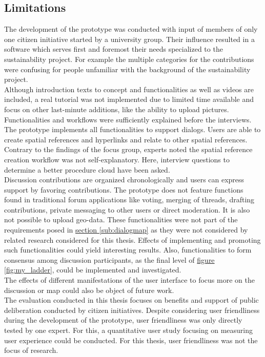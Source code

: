 \subsection{Limitations}
\label{sub:limitations}
The development of the prototype was conducted with input of members of only one citizen initiative started by a university group. Their influence resulted in a software which serves first and foremost their needs specialized to the sustainability project. For example the multiple categories for the contributions were confusing for people unfamiliar with the background of the sustainability project.\\
Although introduction texts to concept and functionalities as well as videos are included, a real tutorial was not implemented due to limited time available and focus on other last-minute additions, like the ability to upload pictures. Functionalities and workflows were sufficiently explained before the interviews.\\
The prototype implements all functionalities to support dialogs. Users are able to create spatial references and hyperlinks and relate to other spatial references. Contrary to the findings of the focus group, experts noted the spatial reference creation workflow was not self-explanatory. Here, interview questions to determine a better procedure cloud have been asked.\\
Discussion contributions are organized chronologically and users can express support by favoring contributions. The prototype does not feature functions found in traditional forum applications like voting, merging of threads, drafting contributions, private messaging to other users or direct moderation. It is also not possible to upload geo-data. These functionalities were not part of the requirements posed in \hyperref[sub:dialogmap]{section \ref{sub:dialogmap}} as they were not considered by related research considered for this thesis. Effects of implementing and promoting such functionalities could yield interesting results. Also, functionalities to form consensus among discussion participants, as the final level of \hyperref[fig:my_ladder]{figure \ref{fig:my_ladder}}, could be implemented and investigated.\\
The effects of different manifestations of the user interface to focus more on the discussion or map could also be object of future work.\\
The evaluation conducted in this thesis focuses on benefits and support of public deliberation conducted by citizen initiatives. Despite considering user friendliness during the development of the prototype, user friendliness was only directly tested by one expert. For this, a quantitative user study focusing on measuring user experience could be conducted. For this thesis, user friendliness was not the focus of research.\\
